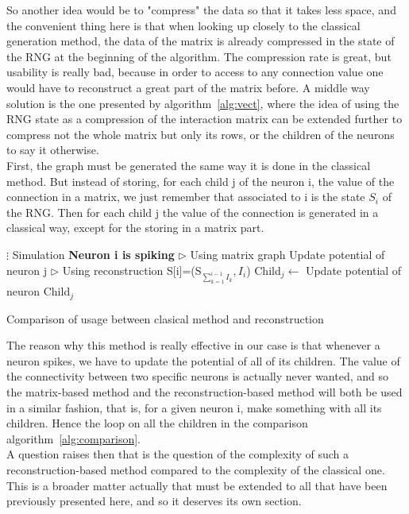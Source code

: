 	So another idea would be to "compress" the data so that it takes less space, and the convenient thing here is that when looking up closely to the classical generation method, the data of the matrix is already compressed in the state of the RNG at the beginning of the algorithm. The compression rate is great, but usability is really bad, because in order to access to any connection value one would have to reconstruct a great part of the matrix before. A middle way solution is the one presented by algorithm~\ref{alg:vect}, where the idea of using the RNG state as a compression of the interaction matrix can be extended further to compress not the whole matrix but only its rows, or the children of the neurons to say it otherwise.\\\indent
	First, the graph must be generated the same way it is done in the classical method. But instead of storing, for each child j of the neuron i, the value of the connection in a matrix, we just remember that associated to i is the state $S_i$ of the RNG. Then for each child j the value of the connection is generated in a classical way, except for the storing in a matrix part.\\\indent
	\begin{algorithm}
		\begin{algorithmic}
				\State {}
				\State {}
				\State \hspace{1.5cm}$\vdots$ Simulation
				\State \textbf{Neuron i is spiking}
				\State $\triangleright$ Using matrix graph
							\State Update potential of neuron j
						\EndIf
					\EndFor
				\State $\triangleright$ Using reconstruction
					\State S[i]=(S$_{\sum_{k=1}^{i-1}I_k},I_i$)
					\State {}
						\State Child$_j\gets$
						\State Update potential of neuron Child$_j$
					\EndFor
			\EndFunction
		\end{algorithmic}
		\caption{Comparison of usage between clasical method and reconstruction}\label{alg:comparison}
	\end{algorithm}
	The reason why this method is really effective in our case is that whenever a neuron spikes, we have to update the potential of all of its children. The value of the connectivity between two specific neurons is actually never wanted, and so the matrix-based method and the reconstruction-based method will both be used in a similar fashion, that is, for a given neuron i, make something with all its children. Hence the loop on all the children in the comparison algorithm~\ref{alg:comparison}.\\\indent
	A question raises then that is the question of the complexity of such a reconstruction-based method compared to the complexity of the classical one. This is a broader matter actually that must be extended to all that have been previously presented here, and so it deserves its own section.\\\indent
